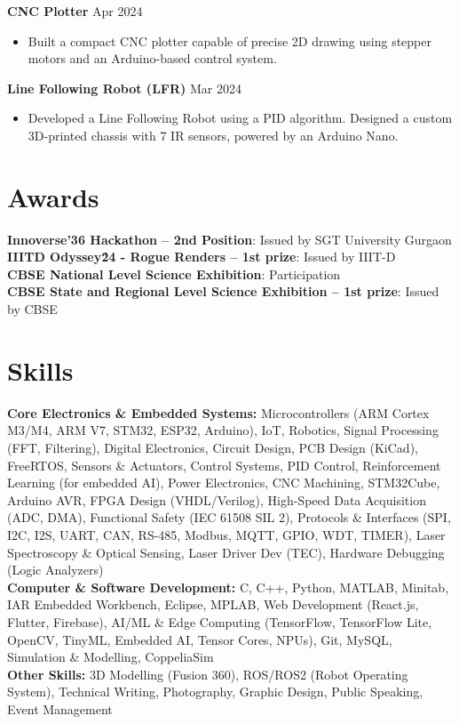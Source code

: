 \documentclass[10pt,a4paper]{article}%
\begin{document}
\noindent \textbf{CNC Plotter} \hfill Apr 2024%
\begin{itemize}[leftmargin=15pt, nosep, topsep=0pt]%
\item Built a compact CNC plotter capable of precise 2D drawing using stepper motors and an Arduino-based control system.%
\end{itemize} \vspace{8pt}%
\noindent \textbf{Line Following Robot (LFR)} \hfill Mar 2024%
\begin{itemize}[leftmargin=15pt, nosep, topsep=0pt]%
\item Developed a Line Following Robot using a PID algorithm. Designed a custom 3D-printed chassis with 7 IR sensors, powered by an Arduino Nano.%
\end{itemize} \vspace{8pt}%
\section*{Awards}%
\noindent \textbf{Innoverse’36 Hackathon -- 2nd Position}: Issued by SGT University Gurgaon \vspace{8pt}\\%
\noindent \textbf{IIITD Odyssey\'24 - Rogue Renders -- 1st prize}: Issued by IIIT-D \vspace{8pt}\\%
\noindent \textbf{CBSE National Level Science Exhibition}: Participation \vspace{8pt}\\%
\noindent \textbf{CBSE State and Regional Level Science Exhibition -- 1st prize}: Issued by CBSE \vspace{8pt}%
\section*{Skills}%
\noindent \textbf{Core Electronics \& Embedded Systems:} Microcontrollers (ARM Cortex M3/M4, ARM V7, STM32, ESP32, Arduino), IoT, Robotics, Signal Processing (FFT, Filtering), Digital Electronics, Circuit Design, PCB Design (KiCad), FreeRTOS, Sensors \& Actuators, Control Systems, PID Control, Reinforcement Learning (for embedded AI), Power Electronics, CNC Machining, STM32Cube, Arduino AVR, FPGA Design (VHDL/Verilog), High-Speed Data Acquisition (ADC, DMA), Functional Safety (IEC 61508 SIL 2), Protocols \& Interfaces (SPI, I2C, I2S, UART, CAN, RS-485, Modbus, MQTT, GPIO, WDT, TIMER), Laser Spectroscopy \& Optical Sensing, Laser Driver Dev (TEC), Hardware Debugging (Logic Analyzers) \vspace{8pt}\\%
\noindent \textbf{Computer \& Software Development:} C, C++, Python, MATLAB, Minitab, IAR Embedded Workbench, Eclipse, MPLAB, Web Development (React.js, Flutter, Firebase), AI/ML \& Edge Computing (TensorFlow, TensorFlow Lite, OpenCV, TinyML, Embedded AI, Tensor Cores, NPUs), Git, MySQL, Simulation \& Modelling, CoppeliaSim \vspace{8pt}\\%
\noindent \textbf{Other Skills:} 3D Modelling (Fusion 360), ROS/ROS2 (Robot Operating System), Technical Writing, Photography, Graphic Design, Public Speaking, Event Management%
\end{document}
